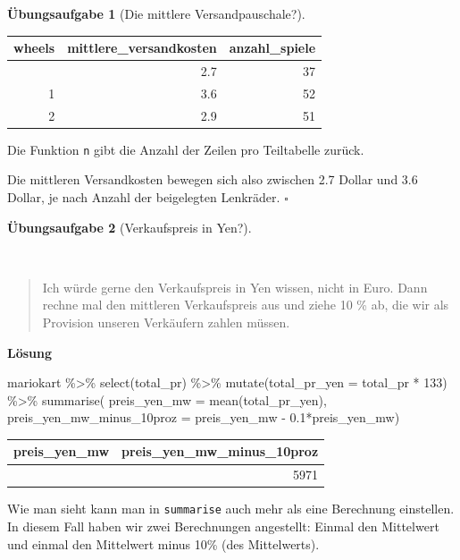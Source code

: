 \documentclass[
  letterpaper,
  twoside,
  open=any]{scrbook}
\newenvironment{Shaded}{\begin{snugshade}}{\end{snugshade}}
\newcommand{\AttributeTok}[1]{\textcolor[rgb]{0.40,0.45,0.13}{#1}}
\newcommand{\DecValTok}[1]{\textcolor[rgb]{0.68,0.00,0.00}{#1}}
\newcommand{\FloatTok}[1]{\textcolor[rgb]{0.68,0.00,0.00}{#1}}
\newcommand{\FunctionTok}[1]{\textcolor[rgb]{0.28,0.35,0.67}{#1}}
\newcommand{\NormalTok}[1]{\textcolor[rgb]{0.00,0.23,0.31}{#1}}
\newcommand{\SpecialCharTok}[1]{\textcolor[rgb]{0.37,0.37,0.37}{#1}}
\theoremstyle{definition}
\theoremstyle{definition}
\newtheorem{exercise}{Übungsaufgabe}[chapter]
\theoremstyle{definition}
\theoremstyle{remark}
\begin{document}
\begin{exercise}[Die mittlere
Versandpauschale?]
\begin{longtable}[]{@{}rrr@{}}
\toprule\noalign{}
wheels & mittlere\_versandkosten & anzahl\_spiele \\
\midrule\noalign{}
\endhead
\bottomrule\noalign{}
\endlastfoot
0 & 2.7 & 37 \\
1 & 3.6 & 52 \\
2 & 2.9 & 51 \\
\end{longtable}

Die Funktion \texttt{n} gibt die Anzahl der Zeilen pro Teiltabelle
zurück.

Die mittleren Versandkosten bewegen sich also zwischen 2.7 Dollar und
3.6 Dollar, je nach Anzahl der beigelegten Lenkräder. \(\square\)

\end{exercise}

\begin{exercise}[Verkaufspreis in
Yen?]\protect\hypertarget{exr-Forschungsfrage3}{}\label{exr-Forschungsfrage3}

~

\begin{quote}
{} Ich würde gerne den Verkaufspreis in Yen wissen, nicht
in Euro. Dann rechne mal den mittleren Verkaufspreis aus und ziehe 10 \%
ab, die wir als Provision unseren Verkäufern zahlen müssen.
\end{quote}

\textbf{Lösung}

\begin{Shaded}
\begin{Highlighting}[]
\NormalTok{mariokart }\SpecialCharTok{\%\textgreater{}\%} 
  \FunctionTok{select}\NormalTok{(total\_pr) }\SpecialCharTok{\%\textgreater{}\%} 
  \FunctionTok{mutate}\NormalTok{(}\AttributeTok{total\_pr\_yen =}\NormalTok{ total\_pr }\SpecialCharTok{*} \DecValTok{133}\NormalTok{) }\SpecialCharTok{\%\textgreater{}\%} 
  \FunctionTok{summarise}\NormalTok{(}
    \AttributeTok{preis\_yen\_mw =} \FunctionTok{mean}\NormalTok{(total\_pr\_yen),}
    \AttributeTok{preis\_yen\_mw\_minus\_10proz =}\NormalTok{ preis\_yen\_mw }\SpecialCharTok{{-}} \FloatTok{0.1}\SpecialCharTok{*}\NormalTok{preis\_yen\_mw)}
\end{Highlighting}
\end{Shaded}

\begin{longtable}[]{@{}rr@{}}
\toprule\noalign{}
preis\_yen\_mw & preis\_yen\_mw\_minus\_10proz \\
\midrule\noalign{}
\endhead
\bottomrule\noalign{}
\endlastfoot
6634 & 5971 \\
\end{longtable}

Wie man sieht kann man in \texttt{summarise} auch mehr als eine
Berechnung einstellen. In diesem Fall haben wir zwei Berechnungen
angestellt: Einmal den Mittelwert und einmal den Mittelwert minus 10\%
(des Mittelwerts).

\end{exercise}
\end{document}
